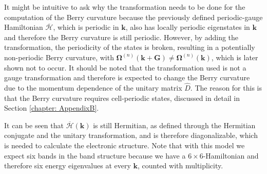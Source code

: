 It might be intuitive to ask why the transformation needs to be done for the computation of the Berry curvature because the previously defined periodic-gauge Hamiltonian $\overline{\mathcal{H}}$, which is periodic in $\mathbf{k}$, also has locally periodic eigenstates in $\mathbf{k}$ and therefore the Berry curvature is still periodic.
However, by adding the transformation, the periodicity of the states is broken, resulting in a potentially non-periodic Berry curvature, with $\bm{\Omega}^{(n)}(\mathbf{k}+\mathbf{G})\neq \bm{\Omega}^{(n)}(\mathbf{k})$, which is later shown not to occur. It should be noted that the transformation used is not a gauge transformation and therefore is expected to change the Berry curvature due to the momentum dependence of the unitary matrix $\hat{D}$. The reason for this is that the Berry curvature requires cell-periodic states, discussed in detail in Section \ref{chapter: AppendixB}.



It can be seen that $\overline{\mathcal{H}}(\mathbf{k})$ is still Hermitian, as defined through the Hermitian conjugate and the unitary transformation, and is therefore diagonalizable, which is needed to calculate the electronic structure. 
Note that with this model we expect six bands in the band structure because we have a $6\times6$-Hamiltonian and therefore six energy eigenvalues at every $\mathbf{k}$, counted with multiplicity. 

